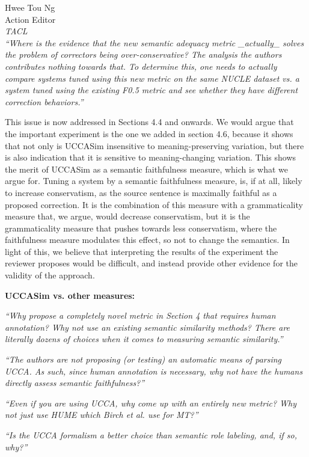 \documentclass[11pt,letterpaper]{letter}
\begin{document}
\begin{letter}{%
Hwee Tou Ng\\
Action Editor\\
{\em TACL}\\
}
\emph{``Where is the evidence that the new semantic adequacy metric \_actually\_
	solves the problem of correctors being over-conservative? The analysis the
	authors contributes nothing towards that. To determine this, one needs to
	actually compare systems tuned using this new metric on the same NUCLE
	dataset vs. a system tuned using the existing F0.5 metric and see whether
	they have different correction behaviors.''
	}

This issue is now addressed in Sections 4.4 and onwards.
We would argue that the important experiment is the one we added in section 4.6, because it shows that not only is UCCASim insensitive to meaning-preserving variation, but there is also indication that it is sensitive to meaning-changing variation. This shows the merit of UCCASim as a semantic faithfulness measure, which is what we argue for.
Tuning a system by a semantic faithfulness measure, is, if at all, likely to increase conservatism, as the source sentence is maximally faithful as a proposed correction. It is the combination of this measure with a grammaticality measure that, we argue, would decrease conservatism, but it is the grammaticality measure that pushes towards less conservatism, where the faithfulness measure modulates this effect, so not to change the semantics. In light of this, we believe that interpreting the results of the experiment the reviewer proposes would be difficult, and instead provide other evidence for the validity of the approach.


\vspace{.5cm}
{\large\bf UCCASim vs. other measures:}

\emph{``Why propose a completely novel metric in Section 4 that requires human
	annotation? Why not use an existing semantic similarity methods? There are
	literally dozens of choices when it comes to measuring semantic similarity.''}

	\emph{``The authors are not proposing (or
	testing) an automatic means of parsing UCCA. As such, since human annotation
	is necessary, why not have the humans directly assess semantic faithfulness?''}

\emph{``Even if you are using UCCA, why come up with an entirely new metric? Why not just use HUME which Birch et al. use for MT?''}


\emph {``Is the UCCA formalism a better choice than semantic role labeling, and, if so, why?''}


\end{letter}
\end{document}
